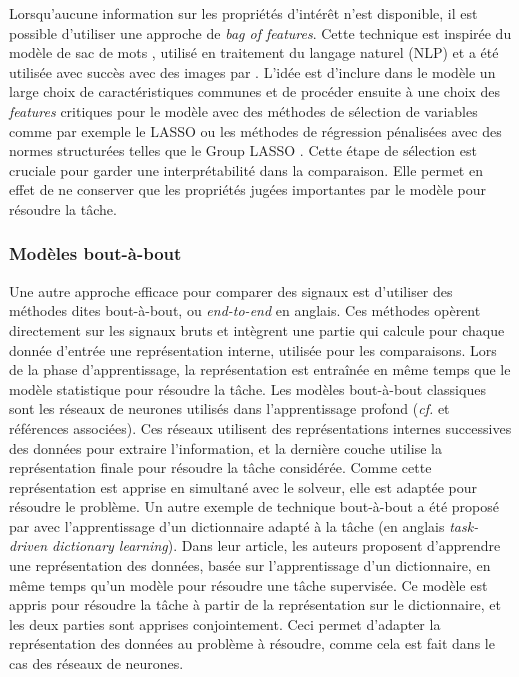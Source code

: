 \documentclass[../thesis.tex]{subfiles}
\begin{document}
	Lorsqu'aucune information sur les propriétés d'intérêt n'est disponible, il est possible
	d'utiliser une approche de \emph{bag of features}. Cette technique est inspirée du modèle
	de sac de mots \citep{Harris1954}, utilisé en traitement du langage naturel (NLP) et a été
	utilisée avec succès avec des images par \citet{Qiu2002}. L'idée est d'inclure dans le
	modèle un large choix de caractéristiques communes et de procéder ensuite à une choix
	des \emph{features} critiques pour le modèle avec des méthodes de sélection de variables
	comme par exemple le LASSO \citep{Tibshirani1996} ou les méthodes de régression pénalisées
	avec des normes structurées telles que le Group LASSO \citep{Yuan2006}. Cette étape de
	sélection est cruciale pour garder une interprétabilité dans la comparaison. Elle permet
	en effet de ne conserver que les propriétés jugées importantes par le modèle pour résoudre
	la tâche.








\subsubsection{Modèles bout-à-bout}
\label{ssub:french:endtoend}


	Une autre approche efficace pour comparer des signaux est d'utiliser des méthodes dites
	bout-à-bout, ou \emph{end-to-end} en anglais. Ces méthodes opèrent directement sur les signaux
	bruts et intègrent une partie qui calcule pour chaque donnée d'entrée une
	représentation interne, utilisée pour les comparaisons. Lors de la phase d'apprentissage,
	la représentation est entraînée en même temps que le modèle statistique pour résoudre
	la tâche. Les modèles bout-à-bout classiques sont les réseaux de neurones utilisés dans
	l'apprentissage profond (\emph{cf.} \citealt{Goodfellow2016} et références associées).
	Ces réseaux utilisent des représentations internes successives
	des données pour extraire l'information, et la dernière couche utilise la représentation
	finale pour résoudre la tâche considérée. Comme cette représentation est apprise en
	simultané avec le solveur, elle est adaptée pour résoudre le problème. Un autre exemple
	de technique bout-à-bout a été proposé par \citep{Mairal2012} avec l'apprentissage d'un
	dictionnaire adapté à la tâche (en anglais \emph{task-driven dictionary learning}). Dans
	leur article, les auteurs proposent d'apprendre une représentation des données, basée sur
	l'apprentissage d'un dictionnaire, en même temps qu’un modèle pour résoudre une tâche
	supervisée. Ce modèle est appris pour résoudre la tâche à partir de la représentation sur
	le dictionnaire, et les deux parties sont apprises conjointement. Ceci permet d'adapter
	la représentation des données au problème à résoudre, comme cela est fait dans le cas des
	réseaux de neurones.
\end{document}
